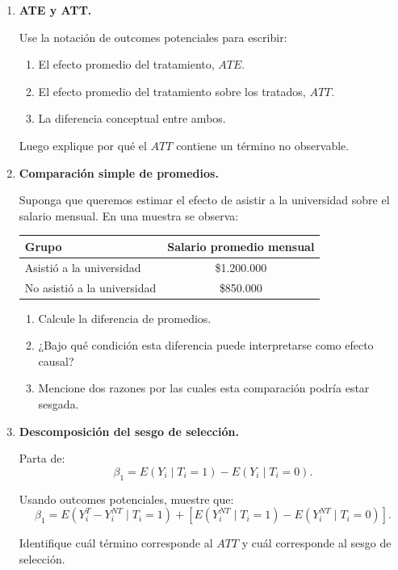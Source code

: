\documentclass[11pt]{article}
\begin{document}
\begin{enumerate}[label=\textbf{Ejercicio \arabic*.}, leftmargin=*]
\item \textbf{ATE y ATT.}

Use la notación de outcomes potenciales para escribir:
\begin{enumerate}[label=\alph*)]
    \item El efecto promedio del tratamiento, $ATE$.
    \item El efecto promedio del tratamiento sobre los tratados, $ATT$.
    \item La diferencia conceptual entre ambos.
\end{enumerate}

Luego explique por qué el $ATT$ contiene un término no observable.

\item \textbf{Comparación simple de promedios.}

Suponga que queremos estimar el efecto de asistir a la universidad sobre el salario mensual. En una muestra se observa:

\begin{center}
\begin{tabular}{lc}
\toprule
Grupo & Salario promedio mensual \\
\midrule
Asistió a la universidad & \$1.200.000 \\
No asistió a la universidad & \$850.000 \\
\bottomrule
\end{tabular}
\end{center}

\begin{enumerate}[label=\alph*)]
    \item Calcule la diferencia de promedios.
    \item ¿Bajo qué condición esta diferencia puede interpretarse como efecto causal?
    \item Mencione dos razones por las cuales esta comparación podría estar sesgada.
\end{enumerate}

\item \textbf{Descomposición del sesgo de selección.}

Parta de:
\[
\beta_1 = E(Y_i \mid T_i=1)-E(Y_i \mid T_i=0).
\]

Usando outcomes potenciales, muestre que:
\[
\beta_1 =
E(Y_i^T-Y_i^{NT}\mid T_i=1)
+
\left[
E(Y_i^{NT}\mid T_i=1)-E(Y_i^{NT}\mid T_i=0)
\right].
\]

Identifique cuál término corresponde al $ATT$ y cuál corresponde al sesgo de selección.


\end{enumerate}
\end{document}
